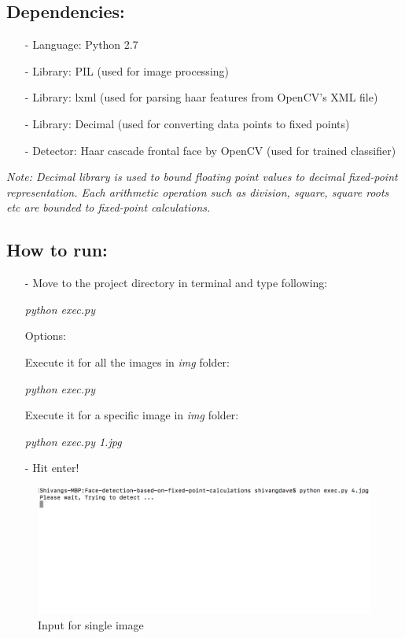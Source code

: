 \documentclass[12pt]{elsarticle}
\begin{document}
\subsection{\textbf{Dependencies:}}
\begin{enumerate}
\item[-] Language: Python 2.7
\item[-] Library: PIL (used for image processing)
\item[-] Library: lxml (used for parsing haar features from OpenCV's XML file)
\item[-] Library: Decimal (used for converting data points to fixed points)
\item[-] Detector: Haar cascade frontal face by OpenCV (used for trained classifier)
\end{enumerate}

\textit{Note: Decimal library is used to bound floating point values to decimal fixed-point representation. Each arithmetic operation such as division, square, square roots etc are bounded to fixed-point calculations.} 

\subsection{\textbf{How to run:}}
\begin{enumerate}
\item[-] Move to the project directory in terminal and type following:
\begin{center}
\subitem \textit{python exec.py}
\end{center}
\item[] Options:
\item[] Execute it for all the images in \textit{img} folder:
\begin{center}
\subitem \textit{python exec.py}
\end{center}
\item[] Execute it for a specific image in \textit{img} folder:
\begin{center}
\subitem \textit{python exec.py 1.jpg}
\end{center}
\item[-] Hit enter!
\end{enumerate}

\begin{figure}[ht]
\centering\includegraphics[width=0.7\linewidth]{input_cmd.png}
\caption{Input for single image}
\end{figure}
\end{document}
